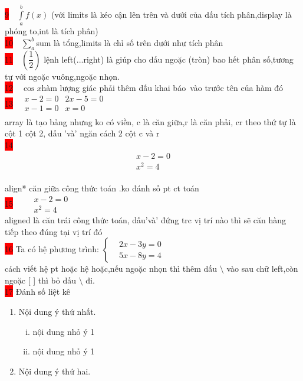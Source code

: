 \documentclass{article}
\begin{document}
\colorbox{red}{9}$\quad\displaystyle\int\limits_a^bf(x)$ (với limits là kéo cận lên trên và dưới của dấu tích phân,display là phóng to,int là tích phân)\\

\colorbox{red}{10}$\quad\displaystyle\sum\limits_a^b$\quad sum là tổng,limits là chỉ số trên dưới như tích phân\\

\colorbox{red}{11}$\quad\left(\dfrac{1}{2}\right)$ \quad lệnh left(...right) là giúp cho dấu ngoặc (tròn) bao hết phân số,tương tự với ngoặc vuông,ngoặc nhọn.\\

\colorbox{red}{12}$\quad\cos x$\quad hàm lượng giác phải thêm dấu khai báo\ vào trước tên của hàm đó\\

 \colorbox{red}{13}$\quad\begin{array}{cr}
 x-2=0 & 2x-5=0\\
 x-1=0 & x=0\\
 \end{array}$\\
 array là tạo bảng nhưng ko có viền, c là căn giữa,r là căn phải, cr theo thứ tự là cột 1 cột 2, dấu 'và' ngăn cách 2 cột c và r\\
 \colorbox{red}{14}\begin{align*}
 x-2=0\\
 x^2=4
 \end{align*}\\
 align* căn giữa công thức toán .ko đánh số pt ct toán\\
\colorbox{red}{15} $\quad\begin{aligned}
 &x-2=0\\
 &x^2=4
 \end{aligned}$\\
 aligned là căn trái công thức toán, dấu'và' đứng trc vị trí nào thì sẽ căn hàng tiếp theo đúng tại vị trí đó\\
 
 \colorbox{red}{16} Ta có hệ phương trình: $\left\{\begin{aligned}
     & 2x-3y=0\\
     & 5x-8y=4
 \end{aligned}\right.$\\
 cách viết hệ pt hoặc hệ hoặc,nếu ngoặc nhọn thì thêm dấu $\setminus$ vào sau chữ left,còn ngoặc [ ] thì bỏ dấu $\setminus$ đi.\\

\colorbox{red}{17} Đánh số liệt kê
 \begin{enumerate}
 \item Nội dung ý thứ nhất.
 \begin{enumerate}[i.]
 \item nội dung nhỏ ý 1
 \item nội dung nhỏ ý 1
 \end{enumerate}
 \item Nội dung ý thứ hai.
 \end{enumerate}
\end{document}
